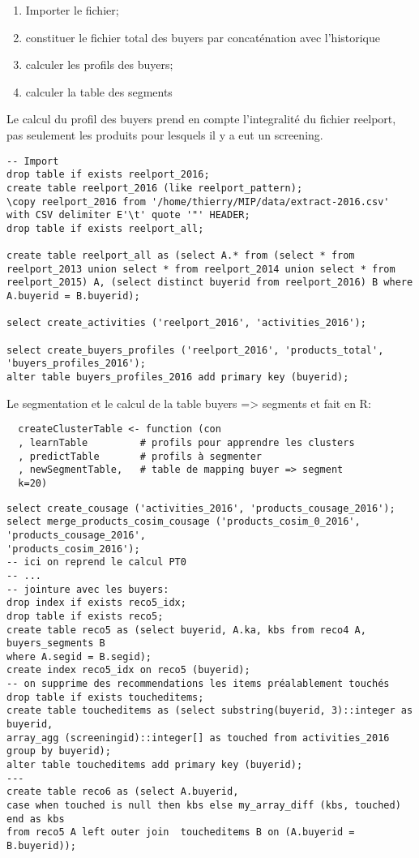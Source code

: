 \documentclass[a4paper,11pt]{article}
\begin{document}
\begin{enumerate}
\item Importer le fichier;
\item constituer le fichier total des buyers par concaténation avec l'historique
\item calculer les profils des buyers;
\item calculer la table des segments
\end{enumerate}

Le calcul du profil des buyers prend en compte l'integralité du fichier reelport, pas seulement les produits
pour lesquels il y a eut un screening.

\begin{verbatim}
-- Import
drop table if exists reelport_2016;
create table reelport_2016 (like reelport_pattern);
\copy reelport_2016 from '/home/thierry/MIP/data/extract-2016.csv' with CSV delimiter E'\t' quote '"' HEADER;
drop table if exists reelport_all;

create table reelport_all as (select A.* from (select * from reelport_2013 union select * from reelport_2014 union select * from reelport_2015) A, (select distinct buyerid from reelport_2016) B where A.buyerid = B.buyerid);

select create_activities ('reelport_2016', 'activities_2016');

select create_buyers_profiles ('reelport_2016', 'products_total', 'buyers_profiles_2016');
alter table buyers_profiles_2016 add primary key (buyerid);

\end{verbatim}

Le segmentation et le calcul de la table buyers => segments et fait en R:
\begin{verbatim}
  createClusterTable <- function (con
  , learnTable         # profils pour apprendre les clusters
  , predictTable       # profils à segmenter
  , newSegmentTable,   # table de mapping buyer => segment
  k=20)
\end{verbatim}

\begin{verbatim}
select create_cousage ('activities_2016', 'products_cousage_2016');
select merge_products_cosim_cousage ('products_cosim_0_2016', 'products_cousage_2016', 
'products_cosim_2016');
-- ici on reprend le calcul PT0
-- ...
-- jointure avec les buyers:
drop index if exists reco5_idx;
drop table if exists reco5;
create table reco5 as (select buyerid, A.ka, kbs from reco4 A, buyers_segments B 
where A.segid = B.segid);
create index reco5_idx on reco5 (buyerid);
-- on supprime des recommendations les items préalablement touchés
drop table if exists toucheditems;
create table toucheditems as (select substring(buyerid, 3)::integer as buyerid, 
array_agg (screeningid)::integer[] as touched from activities_2016 group by buyerid);
alter table toucheditems add primary key (buyerid);
--- 
create table reco6 as (select A.buyerid, 
case when touched is null then kbs else my_array_diff (kbs, touched) end as kbs 
from reco5 A left outer join  toucheditems B on (A.buyerid = B.buyerid));

\end{verbatim}
\end{document}
